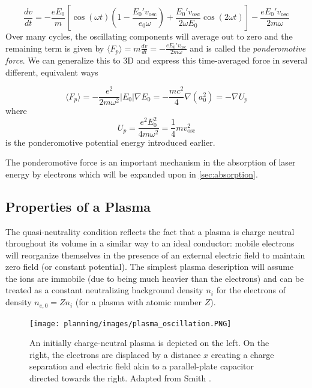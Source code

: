 \begin{equation}
	\frac{d v}{d t} = - \frac{e E_0}{m} [\cos(\omega t)(1 - \frac{E_0' v_\text{osc}}{e_0 \omega}) + \frac{E_0' v_\text{osc}}{2 \omega E_0} \cos(2 \omega t)] - \frac{e E_0' v_\text{osc}}{2 m \omega}
\end{equation}
Over many cycles, the oscillating components will average out to zero and the remaining term is given by $\langle F_p \rangle = m \frac{d v}{d t} = - \frac{e E_0' v_\text{osc}}{2 m \omega}$ and is called the \emph{ponderomotive force}. We can generalize this to 3D and express this time-averaged force in several different, equivalent ways

\begin{equation}
	\langle F_p \rangle = - \frac{e^2}{2 m \omega^2} \lvert E_0 \rvert \nabla E_0 = - \frac{m c^2}{4} \nabla(a_0^2) = - \nabla U_p \label{eq:pond_force}
\end{equation}
where 
\begin{equation}
	U_p = \frac{e^2 E_0^2}{4 m \omega^2} = \frac{1}{4} m v_\text{osc}^2 \label{eq:pond_potential}
\end{equation}
is the ponderomotive potential energy introduced earlier. 

The ponderomotive force is an important mechanism in the absorption of laser energy by electrons which will be expanded upon in \cref{sec:absorption}.

\subsection{Properties of a Plasma}
The quasi-neutrality condition reflects the fact that a plasma is charge neutral throughout its volume in a similar way to an ideal conductor: mobile electrons will reorganize themselves in the presence of an external electric field to maintain zero field (or constant  potential). The simplest plasma description will assume the ions are immobile (due to being much heavier than the electrons) and can be treated as a constant neutralizing background density $n_i$ for the electrons of density $n_{e,0} = Z n_i$ (for a plasma with atomic number $Z$).

\begin{figure}
	\centering
	\texttt{[image: planning/images/plasma\_oscillation.PNG]}
	\caption{An initially charge-neutral plasma is depicted on the left. On the right, the electrons are displaced by a distance $x$ creating a charge separation and electric field akin to a parallel-plate capacitor directed towards the right. Adapted from Smith \cite{Smith_2020_Thesis}.}
	\label{fig:plasma_oscillation}
\end{figure}

